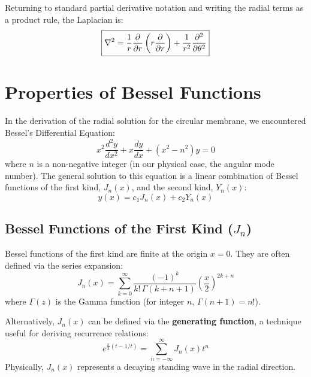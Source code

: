 \documentclass[11pt, letterpaper]{article}
\begin{document}
Returning to standard partial derivative notation and writing the radial terms as a product rule, the Laplacian is:
\begin{equation}
\boxed{\nabla^2 = \frac{1}{r} \pdv{r} \left( r \pdv{r} \right) + \frac{1}{r^2} \pdv[2]{\theta}}
\end{equation}

\section{Properties of Bessel Functions}

In the derivation of the radial solution for the circular membrane, we encountered Bessel's Differential Equation:
\begin{equation}
    x^2 \frac{d^2 y}{dx^2} + x \frac{dy}{dx} + (x^2 - n^2)y = 0
\end{equation}
where $n$ is a non-negative integer (in our physical case, the angular mode number). The general solution to this equation is a linear combination of Bessel functions of the first kind, $J_n(x)$, and the second kind, $Y_n(x)$:
\begin{equation}
    y(x) = c_1 J_n(x) + c_2 Y_n(x)
\end{equation}

\subsection{Bessel Functions of the First Kind ($J_n$)}
Bessel functions of the first kind are finite at the origin $x=0$. They are often defined via the series expansion:
\begin{equation}
    J_n(x) = \sum_{k=0}^{\infty} \frac{(-1)^k}{k! \, \Gamma(k+n+1)} \left(\frac{x}{2}\right)^{2k+n}
\end{equation}
where $\Gamma(z)$ is the Gamma function (for integer $n$, $\Gamma(n+1) = n!$).



Alternatively, $J_n(x)$ can be defined via the \textbf{generating function}, a technique useful for deriving recurrence relations:
\begin{equation}
    e^{\frac{x}{2}(t - 1/t)} = \sum_{n=-\infty}^{\infty} J_n(x) t^n
\end{equation}
Physically, $J_n(x)$ represents a decaying standing wave in the radial direction.
\end{document}
